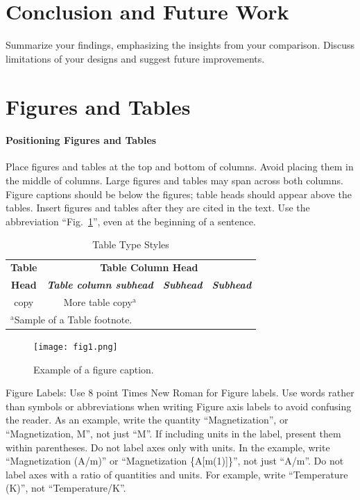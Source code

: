 \documentclass[conference]{IEEEtran}
\begin{document}
\section{Conclusion and Future Work}

Summarize your findings, emphasizing the insights from your comparison. Discuss limitations of your designs and suggest future improvements.

\section*{Figures and Tables}
\paragraph{Positioning Figures and Tables} Place figures and tables at the top and 
bottom of columns. Avoid placing them in the middle of columns. Large 
figures and tables may span across both columns. Figure captions should be 
below the figures; table heads should appear above the tables. Insert 
figures and tables after they are cited in the text. Use the abbreviation 
``Fig.~\ref{fig}'', even at the beginning of a sentence.

\begin{table}[htbp]
\caption{Table Type Styles}
\begin{center}
\begin{tabular}{|c|c|c|c|}
\hline
\textbf{Table}&\multicolumn{3}{|c|}{\textbf{Table Column Head}} \\
\cline{2-4} 
\textbf{Head} & \textbf{\textit{Table column subhead}}& \textbf{\textit{Subhead}}& \textbf{\textit{Subhead}} \\
\hline
copy& More table copy$^{\mathrm{a}}$& &  \\
\hline
\multicolumn{4}{l}{$^{\mathrm{a}}$Sample of a Table footnote.}
\end{tabular}
\label{tab1}
\end{center}
\end{table}

\begin{figure}[htbp]
\centerline{\texttt{[image: fig1.png]}}
\caption{Example of a figure caption.}
\label{fig}
\end{figure}

Figure Labels: Use 8 point Times New Roman for Figure labels. Use words 
rather than symbols or abbreviations when writing Figure axis labels to 
avoid confusing the reader. As an example, write the quantity 
``Magnetization'', or ``Magnetization, M'', not just ``M''. If including 
units in the label, present them within parentheses. Do not label axes only 
with units. In the example, write ``Magnetization (A/m)'' or ``Magnetization 
\{A[m(1)]\}'', not just ``A/m''. Do not label axes with a ratio of 
quantities and units. For example, write ``Temperature (K)'', not 
``Temperature/K''.


  
\end{document}
